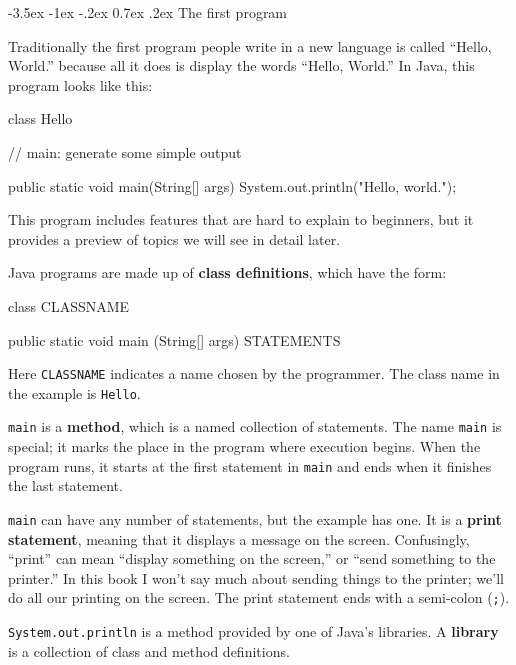 \documentclass{book}
\makeatletter
\renewcommand{\section}{\@startsection 
    {section} {1} {0mm}%
    {-3.5ex \@plus -1ex \@minus -.2ex}%
    {0.7ex \@plus.2ex}%
    {\normalfont\Large\bfseries}}
\makeatother
\begin{document}
\section{The first program}
\label{hello}

Traditionally the first program people write in a new language
is called ``Hello, World.'' because all it does is display the
words ``Hello, World.''  In Java, this program looks like this:

\begin{verbatimtab}
class Hello {

  // main: generate some simple output

  public static void main(String[] args) {
    System.out.println("Hello, world.");
  }
}
\end{verbatimtab}
%
This program includes features that are hard to explain to
beginners, but it provides a preview of topics we
will see in detail later.

Java programs are made up of {\bf class definitions}, which have
the form:


\begin{verbatimtab}
class CLASSNAME {

  public static void main (String[] args) {
    STATEMENTS
  }
}
\end{verbatimtab}
%
Here {\tt CLASSNAME} indicates a name chosen by the programmer.
The class name in the example is {\tt Hello}.


{\tt main} is a {\bf method}, which is a named collection of
statements.  The name {\tt main} is special; it marks the place in the
program where execution begins.  When the program runs, it starts at
the first statement in {\tt main} and ends when it finishes the last
statement.


{\tt main} can have any number of statements, but the example has one.
It is a {\bf print statement}, meaning that it displays a message on
the screen.  Confusingly, ``print'' can mean ``display something on
the screen,'' or ``send something to the printer.''  In this book I
won't say much about sending things to the printer; we'll do all our
printing on the screen.  The print statement ends with a semi-colon
({\tt ;}).

{\tt System.out.println} is a method provided by one of Java's
libraries.  A {\bf library} is a collection of class and method
definitions.
\end{document}
